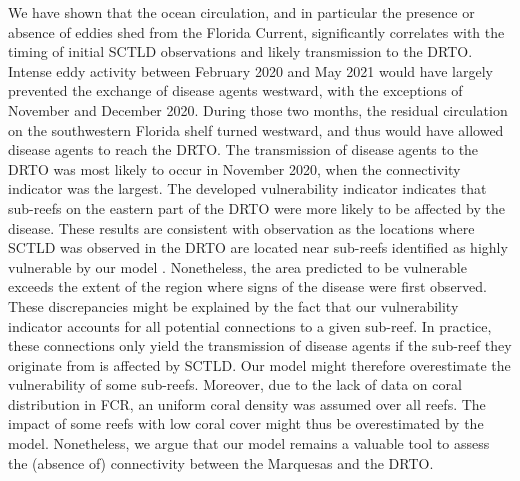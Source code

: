 We have shown that the ocean circulation, and in particular the presence or absence of eddies shed from the Florida Current, significantly correlates with the timing of initial SCTLD observations and likely transmission to the DRTO. Intense eddy activity between February 2020 and May 2021 would have largely prevented the exchange of disease agents westward, with the exceptions of November and December 2020. During those two months, the residual circulation on the southwestern Florida shelf turned westward, and thus would have allowed disease agents to reach the DRTO. The transmission of disease agents to the DRTO was most likely to occur in November 2020, when the connectivity indicator was the largest. The developed vulnerability indicator indicates that sub-reefs on the eastern part of the DRTO were more likely to be affected by the disease. These results are consistent with observation as the locations where SCTLD was observed in the DRTO are located near sub-reefs identified as highly vulnerable by our model \citep{kramer2019map}. Nonetheless, the area predicted to be vulnerable exceeds the extent of the region where signs of the disease were first observed. These discrepancies might be explained by the fact that our vulnerability indicator accounts for all potential connections to a given sub-reef. In practice, these connections only yield the transmission of disease agents if the sub-reef they originate from is affected by SCTLD. Our model might therefore overestimate the vulnerability of some sub-reefs. Moreover, due to the lack of data on coral distribution in FCR, an uniform coral density was assumed over all reefs. The impact of some reefs with low coral cover might thus be overestimated by the model. Nonetheless, we argue that our model remains a valuable tool to assess the (absence of) connectivity between the Marquesas and the DRTO.
 
